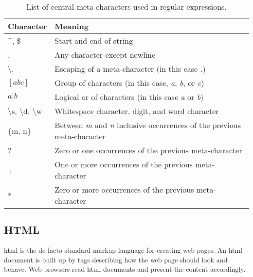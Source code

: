 \begin{table}
    \centering
    \noindent\begin{tabulary}{\textwidth}{| L | L |}
        \hline
        \textbf{Character}                                              & \textbf{Meaning} \\\hline
        \textasciicircum, \$                                            & Start and end of string \\\hline
        .                                                               & Any character except newline \\\hline
        \textbackslash .                                                & Escaping of a meta-character (in this case \textit{.}) \\\hline
        $[abc]$                                                           & Group of characters (in this case, \textit{a}, \textit{b}, or \textit{c}) \\\hline
        $a|b$                                                             & Logical or of characters (in this case \textit{a} or \textit{b}) \\\hline
        \textbackslash s, \textbackslash d, \textbackslash w            & Whitespace character, digit, and word character \\\hline
        \{m, n\}                                                        & Between \textit{m} and \textit{n} inclusive occurrences of the previous meta-character \\\hline
        ?                                                               & Zero or one occurrences of the previous meta-character \\\hline
        +                                                               & One or more occurrences of the previous meta-character \\\hline
        *                                                               & Zero or more occurrences of the previous meta-character \\\hline
    \end{tabulary}
    \caption{List of central meta-characters used in regular expressions.}
    \label{tab:regular-expression-meaning}
\end{table}


\subsection{HTML}

\gls{html} is the de facto standard markup language for creating web pages. An \gls{html} document is built up by tags describing how the web page should look and behave. Web browsers read \gls{html} documents and present the content accordingly.


